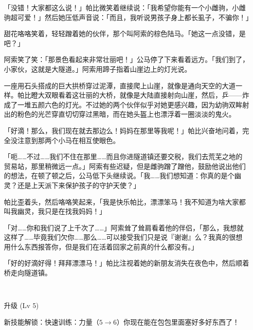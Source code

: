 「没错！大家都这么说！」帕比微笑着继续说：「我希望你能有一个小雌驹，小雌驹超可爱！」然后她压低声音说：「而且，我听说男孩子身上都长虱子，不骗你！」

甜花咯咯笑着，轻轻蹭着她的伙伴，那个叫阿索的棕色陆马。「她这一点没错，是吧？」

阿索笑了笑：「那景色看起来非常壮丽吧！」公马停了下来看着远方。「我们到了，小家伙，这就是大隧道。」阿索用蹄子指着山崖边上的灯光说。

一座用石头搭成的巨大拱桥穿过泥潭，直接爬上山崖，就像是通向天空的大道一样。帕比瞪大双眼看着这壮丽的大桥，就像是大陆直接射向山崖，然后，乒——炸成了一堆五颜六色的灯光。不过她的两个伙伴似乎对她更感兴趣，因为幼驹双眸射出的粉色的光芒穿直切切穿过黑暗，而在她头盔上也漂浮着一圈淡淡的鬼火。

「好滴！那么，我们现在就去那边么！妈妈在那里等我呢！」帕比兴奋地问着，完全没注意到那两个小马在相互使眼色。

「呃……不过……我们不住在那里……而且你进隧道镇还要交税，我们去荒芜之地的贸易站，那里稍微远一点。」阿索有些迟疑，但是雌驹蹭了蹭他，鼓励他说出他们的想法，在顿了顿之后，公马低下头继续说。「我……我们想知道：你真的是个幽灵？还是上天派下来保护孩子的守护天使？」

帕比歪着头，然后咯咯笑起来，「我是快乐帕比，漂漂笨马！我不知道为啥大家都叫我幽灵，我只是在找我妈妈！」

「对……你和我们说了上千次了……」阿索耸了耸肩看着他的伴侣，「那么，我想就这样了……毕竟我们欠你……那么……可以接受我们只是说『谢谢』么？我真的很想用什么东西报答你，但是我们在活着回家之前真的什么都没有。」

「好的好滴好得！拜拜漂漂马！」帕比注视着她的新朋友消失在夜色中，然后顺着桥走向隧道镇。

\clearpage

~\vfill

\begin{note}
    升级 (Lv 5)

    新技能解锁：快速训练：力量（$5 \to 6$）你现在能在包包里面塞好多好东西了！
\end{note}



